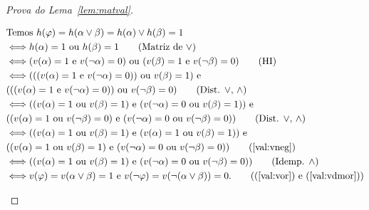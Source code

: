 \begin{proof}[Prova do Lema~\ref{lem:matval}]
\begin{provaporcasos}
                \begin{provaporsubcasos}
                    \begin{align*}
                        &\textnormal{Temos }h(\phi) = h(\alpha \lor \beta) = h(\alpha) \lor h(\beta) = 1\\
                        &\Longleftrightarrow h(\alpha) = 1\textnormal{ ou }h(\beta) = 1\tag*{(Matriz de $\lor$)}\\
                        &\Longleftrightarrow (v(\alpha) = 1 \text{ e } v(\neg \alpha) = 0)\textnormal{ ou }(v(\beta) = 1 \textnormal{ e } v(\neg \beta) = 0)\tag*{(HI)}\\
                        &\Longleftrightarrow (((v(\alpha) = 1 \text{ e } v(\neg \alpha) = 0))\text{ ou }v(\beta) = 1) \text{ e }\\&(((v(\alpha) = 1 \text{ e } v(\neg \alpha) = 0))\text{ ou }v(\neg\beta) = 0)\tag*{(Dist. $\lor$, $\land$)}\\
                        &\Longleftrightarrow ((v(\alpha) = 1 \textnormal{ ou } v(\beta) = 1) \text{ e } (v(\neg \alpha) = 0 \text{ ou } v(\beta) = 1)) \text{ e }\\&((v(\alpha) = 1 \textnormal{ ou } v(\neg \beta) = 0) \text{ e } (v(\neg \alpha) = 0 \text{ ou } v(\neg \beta) = 0))\tag*{(Dist. $\lor$, $\land$)}\\
                        &\Longleftrightarrow ((v(\alpha) = 1 \textnormal{ ou } v(\beta) = 1) \text{ e } (v(\alpha) = 1 \text{ ou } v(\beta) = 1)) \text{ e }\\&((v(\alpha) = 1 \textnormal{ ou } v(\beta) = 1) \text{ e } (v(\neg \alpha) = 0 \text{ ou } v(\neg \beta) = 0))\tag*{(\ref{val:vneg})}\\
                        &\Longleftrightarrow ((v(\alpha) = 1 \textnormal{ ou } v(\beta) = 1) \text{ e } (v(\neg \alpha) = 0 \text{ ou } v(\neg \beta) = 0))\tag*{(Idemp. $\land$)}\\
                        &\Longleftrightarrow v(\phi) = v(\alpha \lor \beta) = 1\textnormal{ e }v(\neg \phi) = v(\neg(\alpha \lor \beta)) = 0.\tag*{((\ref{val:vor}) e (\ref{val:vdmor}))}
                    \end{align*}
                        

\end{provaporsubcasos}
\end{provaporcasos}
\end{proof}
